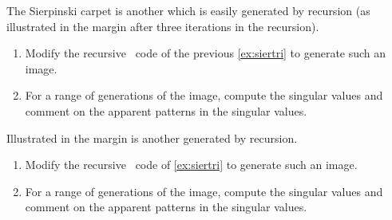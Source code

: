 \begin{exercise} \label{ex:} 
The Sierpinski carpet is another  which is easily generated by recursion (as illustrated in the margin after three iterations in the recursion).
\marginpar{}
\begin{enumerate}
\item Modify the recursive \script\ code of the previous \autoref{ex:siertri} to generate such an image.

\item For a range of generations of the image, compute the singular values and comment on the apparent patterns in the singular values.
\end{enumerate}
\end{exercise}


\begin{exercise} \label{ex:} 
Illustrated in the margin is another  generated by recursion.
\marginpar{}
\begin{enumerate}
\item Modify the recursive \script\ code of \autoref{ex:siertri} to generate such an image.

\item For a range of generations of the image, compute the singular values and comment on the apparent patterns in the singular values.
\end{enumerate}
\end{exercise}





